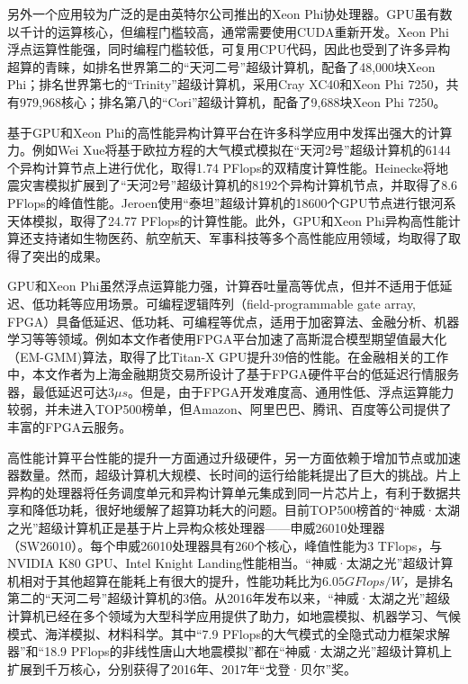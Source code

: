 \documentclass[degree=doctor]{thuthesis}
\begin{document}
另外一个应用较为广泛的是由英特尔公司推出的Xeon Phi协处理器\cite{jeffers2013intel}。GPU虽有数以千计的运算核心，但编程门槛较高，通常需要使用CUDA\cite{cook2012cuda}重新开发。Xeon Phi浮点运算性能强，同时编程门槛较低，可复用CPU代码，因此也受到了许多异构超算的青睐，如排名世界第二的“天河二号”超级计算机，配备了48,000块Xeon Phi\cite{liao2014milkyway}；排名世界第七的“Trinity”超级计算机\cite{Trinity}，采用Cray XC40和Xeon Phi 7250，共有979,968核心；排名第八的“Cori”超级计算机\cite{doerfler2018evaluating}，配备了9,688块Xeon Phi 7250。

基于GPU和Xeon Phi的高性能异构计算平台在许多科学应用中发挥出强大的计算力。例如Wei Xue将基于欧拉方程的大气模式模拟在“天河2号”超级计算机的6144个异构计算节点上进行优化，取得1.74 PFlops的双精度计算性能\cite{xue2015ultra}。Heinecke将地震灾害模拟扩展到了“天河2号”超级计算机的8192个异构计算机节点，并取得了8.6 PFlops的峰值性能\cite{heinecke2014petascale}。Jeroen使用“泰坦”超级计算机的18600个GPU节点进行银河系天体模拟，取得了24.77 PFlops的计算性能\cite{bedorf201424}。此外，GPU和Xeon Phi异构高性能计算还支持诸如生物医药\cite{tumeo2010accelerating,chen2008gpu}、航空航天\cite{habib2012universe,kampolis2010cfd}、军事科技\cite{ariga2014fast,fronckowiak2009using}等多个高性能应用领域，均取得了取得了突出的成果。

GPU和Xeon Phi虽然浮点运算能力强，计算吞吐量高等优点，但并不适用于低延迟、低功耗等应用场景。可编程逻辑阵列（field-programmable gate array, FPGA）具备低延迟、低功耗、可编程等优点，适用于加密算法\cite{elbirt2000fpga,elbirt2000fpga,hauser1997garp}、金融分析\cite{zhang2005reconfigurable,jin2013optimising,tse2010reconfigurable,becker2015maxeler}、机器学习\cite{irick2008hardware,zhang2015optimizing,wang2017dlau}等等领域。例如本文作者使用FPGA平台加速了高斯混合模型期望值最大化（EM-GMM)算法，取得了比Titan-X GPU提升39倍的性能\cite{he2017fully}。在金融相关的工作中，本文作者为上海金融期货交易所设计了基于FPGA硬件平台的低延迟行情服务器\cite{fu2017nanosecond,he2017exploring,fu2017accelerating}，最低延迟可达$3\mu s$。但是，由于FPGA开发难度高、通用性低、浮点运算能力较弱，并未进入TOP500榜单，但Amazon、阿里巴巴、腾讯、百度等公司提供了丰富的FPGA云服务\cite{tarafdar2018designing}。

高性能计算平台性能的提升一方面通过升级硬件，另一方面依赖于增加节点或加速器数量。然而，超级计算机大规模、长时间的运行给能耗提出了巨大的挑战\cite{reed2015exascale}。片上异构的处理器将任务调度单元和异构计算单元集成到同一片芯片上，有利于数据共享和降低功耗，很好地缓解了超算功耗大的问题。目前TOP500榜首的“神威·太湖之光”超级计算机正是基于片上异构众核处理器\cite{fu2016sunway}——申威26010处理器（SW26010）。每个申威26010处理器具有260个核心，峰值性能为3 TFlops，与NVIDIA K80 GPU、Intel Knight Landing性能相当\cite{einkemmer2017evaluation,sodani2016knights}。“神威·太湖之光”超级计算机相对于其他超算在能耗上有很大的提升，性能功耗比为$6.05GFlops/W$，是排名第二的“天河二号”超级计算机的3倍。从2016年发布以来，“神威·太湖之光”超级计算机已经在多个领域为大型科学应用提供了助力，如地震模拟\cite{fu201718}、机器学习\cite{fang2017swdnn}、气候模式\cite{yang201610m,fu2016refactoring}、海洋模拟\cite{qiao2016highly}、材料科学\cite{zhang2016extreme}。其中“7.9 PFlops的大气模式的全隐式动力框架求解器”和“18.9 PFlops的非线性唐山大地震模拟”都在“神威·太湖之光”超级计算机上扩展到千万核心，分别获得了2016年、2017年“戈登·贝尔”奖。
\end{document}
